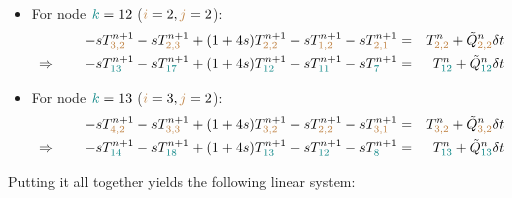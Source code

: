 \begin{itemize}
\item For node ${\color{teal}k}=12$ (${\color{brown}i}=2,{\color{brown}j}=2$):
\begin{eqnarray}
-s T_{{\color{brown} 3,2}}^{n+1}
-s T_{{\color{brown}2,3}}^{n+1} 
+(1+4s)T_{{\color{brown}2,2}}^{n+1} 
-s T_{{\color{brown}1,2}}^{n+1} 
-s T_{{\color{brown}2,1}}^{n+1} 
&=& T_{{\color{brown}2,2}}^n 
+\tilde{Q}_{{\color{brown}2,2}}^n \delta t \nonumber\\
\Rightarrow \qquad
-s T_{{\color{teal} 13}}^{n+1}
-s T_{{\color{teal} 17}}^{n+1} 
+(1+4s)T_{{\color{teal}12}}^{n+1} 
-s T_{{\color{teal}11}}^{n+1} 
-s T_{{\color{teal}7}}^{n+1} 
&=& T_{{\color{teal}12}}^n 
+\tilde{Q}_{{\color{teal}12}}^n\delta t
\end{eqnarray}


\item For node ${\color{teal}k}=13$ (${\color{brown}i}=3,{\color{brown}j}=2$):
\begin{eqnarray}
-s T_{{\color{brown} 4,2}}^{n+1}
-s T_{{\color{brown}3,3}}^{n+1} 
+(1+4s)T_{{\color{brown}3,2}}^{n+1} 
-s T_{{\color{brown}2,2}}^{n+1} 
-s T_{{\color{brown}3,1}}^{n+1} 
&=& T_{{\color{brown}3,2}}^n 
+\tilde{Q}_{{\color{brown}3,2}}^n \delta t\nonumber\\
\Rightarrow \qquad
-s T_{{\color{teal} 14}}^{n+1}
-s T_{{\color{teal} 18}}^{n+1} 
+(1+4s)T_{{\color{teal}13}}^{n+1} 
-s T_{{\color{teal}12}}^{n+1} 
-s T_{{\color{teal}8}}^{n+1} 
&=& T_{{\color{teal}13}}^n 
+\tilde{Q}_{{\color{teal}13}}^n \delta t
\end{eqnarray}


\end{itemize}

Putting it all together yields the following linear system:


